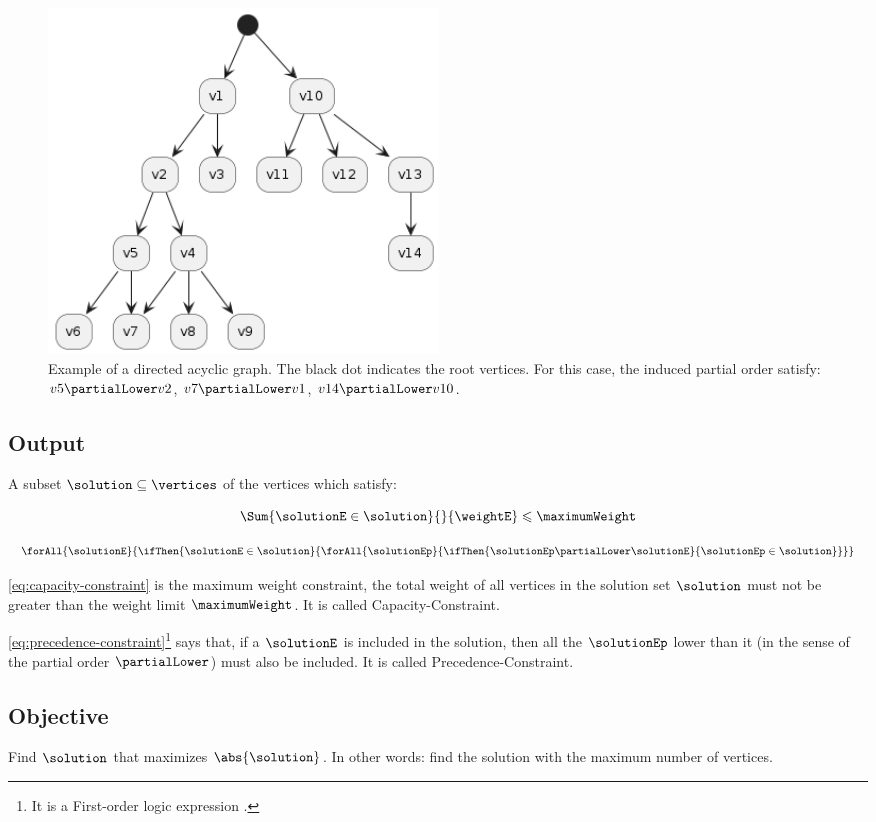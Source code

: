 \begin{figure}[ht!]
    \centering
    \includegraphics[width=0.5\textwidth]{images/directed acyclic graph.png}
    \caption{Example of a directed acyclic graph. The black dot indicates the root vertices. For this case, the induced partial order satisfy: $v5 \partialLower v2$, $v7 \partialLower v1$, $v14 \partialLower v10$.}
\end{figure}

\subsection{Output}

A subset $\solution \subseteq \vertices$ of the vertices which satisfy:

\begin{equation}
    \label{eq:capacity-constraint}
    \Sum
        {\solutionE \in \solution}
        {}
        {\weightE}
    \leqslant
    \maximumWeight
\end{equation}

\begin{equation}
    \label{eq:precedence-constraint}
    \forAll
        {\solutionE}
        {\ifThen
            {\solutionE \in \solution}
            {\forAll
                {\solutionEp}
                {\ifThen
                    {\solutionEp \partialLower \solutionE}
                    {\solutionEp \in \solution}
                }
            }
        }
\end{equation}

\eqref{eq:capacity-constraint} is the maximum weight constraint, the total weight of all vertices in the solution set $\solution$ must not be greater than the weight limit $\maximumWeight$. It is called Capacity-Constraint.

\eqref{eq:precedence-constraint}\footnote{It is a First-order logic expression \cite{bib:logic}.} says that, if a $\solutionE$ is included in the solution, then all the $\solutionEp$ lower than it (in the sense of the partial order $\partialLower$) must also be included. It is called Precedence-Constraint.

\subsection{Objective}

Find $\solution$ that maximizes $\abs{\solution}$. In other words: find the solution with the maximum number of vertices.
